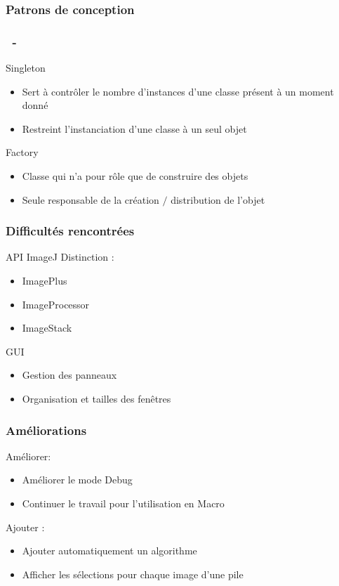 \documentclass[11pt]{beamer}
\begin{document}
\subsubsection*{Patrons de conception}
\begin{frame}
\frametitle{\subsecname ~- \subsubsecname}
	\begin{block}{Singleton}
		\begin{itemize}
			\item Sert à contrôler le nombre d'instances d'une classe présent à un moment donné
			\item Restreint l'instanciation d'une classe à un seul objet
		\end{itemize}
	\end{block}
	\begin{block}{Factory}
		\begin{itemize}
			\item Classe qui n'a pour rôle que de construire des objets
			\item Seule responsable de la création $/$ distribution de l’objet
		\end{itemize}
	\end{block}
\end{frame}
\begin{frame}
\frametitle{Difficultés rencontrées}
	\begin{block}{API ImageJ}
	Distinction :
		\begin{itemize}
			\item ImagePlus
			\item ImageProcessor
			\item ImageStack
		\end{itemize}
	\end{block}
	\begin{block}{GUI}
		\begin{itemize}
			\item Gestion des panneaux
			\item Organisation et tailles des fenêtres
		\end{itemize}
	\end{block}
\end{frame}
\begin{frame}
\frametitle{Améliorations}
	\begin{block}{Améliorer:}
		\begin{itemize}
			\item Améliorer le mode Debug
			\item Continuer le travail pour l'utilisation en Macro
		\end{itemize}
	\end{block}
	\begin{block}{Ajouter :}
		\begin{itemize}
			\item Ajouter automatiquement un algorithme
			\item Afficher les sélections pour chaque image d'une pile
		\end{itemize}
	\end{block}
\end{frame}
\end{document}
